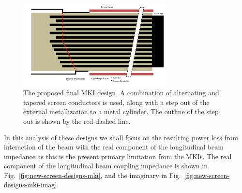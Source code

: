 \begin{figure}
\begin{center}
\includegraphics[width=0.7\textwidth]{LHC_MKI/figures/mki-design-layouts/mki-final-design.pdf}
\end{center}
\caption{The proposed final MKI design. A combination of alternating and tapered screen conductors is used, along with a step out of the external metallization to a metal cylinder. The outline of the step out is shown by the red-dashed line.}
\label{fig:24-final-design}
\end{figure}

In this analysis of these designs we shall focus on the resulting power loss from interaction of the beam with the real component of the longitudinal beam impedance as this is the present primary limitation from the MKIs. The real component of the longitudinal beam coupling impedance is shown in Fig.~\ref{fig:new-screen-designs-mki}, and the imaginary in Fig.~\ref{fig:new-screen-designs-mki-imag}.


